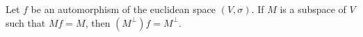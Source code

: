 Let $f$ be an automorphism of the euclidean space $(V, \sigma)$. If $M$ is a subspace of $V$ such that $Mf = M$, then $(M^\perp)f = M^\perp$.
